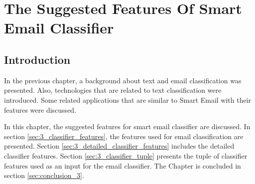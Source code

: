 \label{sec:3_classifier_features}
\label{sec:3_detailed_classifier_features}
\label{sec:3_classifier_tuple}
\label{sec:conclusion_3}

\chapter{The Suggested Features Of Smart Email Classifier} %

\label{Chapter3} %



\section{Introduction}
In the previous chapter, a background about text and email classification was 
presented. Also, technologies that are related to text classification were 
introduced. Some related applications that are similar to Smart Email with their 
features were discussed.

In this chapter, the suggested features for smart email classifier are discussed.
In section \ref{sec:3_classifier_features}, the features used for email 
classification are presented. Section \ref{sec:3_detailed_classifier_features} 
includes the detailed classifier features. Section \ref{sec:3_classifier_tuple} 
presents the tuple of classifier features used as an input for the email 
classifier. The Chapter is concluded in section \ref{sec:conclusion_3}.
\newpage
